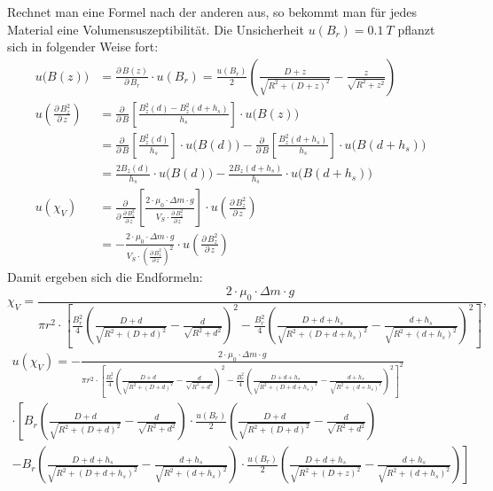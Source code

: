 \documentclass[11pt,a4paper,titlepage, ngerman]{article}
\begin{document}
	Rechnet man eine Formel nach der anderen aus, so bekommt man für jedes Material eine Volumensuszeptibilität.
	Die Unsicherheit $u(B_r) = \SI{0,1}{T}$ pflanzt sich in folgender Weise fort:
	\begin{align}
		u\big(B(z)\big) &= \frac{\partial\,B(z)}{\partial\,B_r} \cdot u(B_r) = \frac{u(B_r)}{2}\left( \frac{D+z}{\sqrt{R^2 + (D+z)^2}} - \frac{z}{\sqrt{R^2 + z^2}}\right)\\
		u\left( \frac{\partial\,B^2_z}{\partial\,z}\right)
		&= \frac{\partial\,}{\partial\,B}\left[ \frac{B_z^2(d) - B_z^2(d+h_s)}{h_s}\right]  \cdot u\big(B(z)\big)\\
		&= \frac{\partial\,}{\partial\,B} \left[ \frac{B_z^2(d)}{h_s}\right]  \cdot u\big(B(d)\big) - \frac{\partial\,}{\partial\,B} \left[ \frac{ B_z^2(d+h_s)}{h_s}\right]  \cdot u\big(B(d+h_s)\big)\\
		&= \frac{2B_z(d)}{h_s} \cdot u\big(B(d)\big) - \frac{2B_z(d+h_s)}{h_s} \cdot u\big(B(d+h_s)\big)\\
		u\left( \chi_V\right) &= \frac{\partial\,}{\partial\,\frac{\partial\,B_z^2}{\partial\,z}} \left[ \frac{2 \cdot \mu_0 \cdot \Delta m \cdot g}{V_S \cdot \frac{\partial\,B_z^2}{\partial\,z}}\right] \cdot u\left( \frac{\partial\,B_z^2}{\partial\,z}\right) \\
		&= - \frac{2 \cdot \mu_0 \cdot \Delta m \cdot g}{V_S \cdot \left( \frac{\partial\,B_z^2}{\partial\,z}\right) ^2} \cdot u\left( \frac{\partial\,B_z^2}{\partial\,z}\right)
	\end{align}
	Damit ergeben sich die Endformeln:
	\begin{equation}
		\chi_V = \frac{2 \cdot \mu_0 \cdot \Delta m \cdot g}{\pi r^2 \cdot \left[ \frac{B_r^2}{4}\left( \frac{D+d}{\sqrt{R^2 + (D+d)^2}} - \frac{d}{\sqrt{R^2 + d^2}}\right)^2 - \frac{B_r^2}{4}\left( \frac{D+d+h_s}{\sqrt{R^2 + (D+d+h_s)^2}} - \frac{d+h_s}{\sqrt{R^2 + (d+h_s)^2}}\right)^2\right] },
	\end{equation}
	\begin{align}
		u(\chi_V) = - \frac{2 \cdot \mu_0 \cdot \Delta m \cdot g}{\pi r^2 \cdot \left[ \frac{B_r^2}{4}\left( \frac{D+d}{\sqrt{R^2 + (D+d)^2}} - \frac{d}{\sqrt{R^2 + d^2}}\right)^2 - \frac{B_r^2}{4}\left( \frac{D+d+h_s}{\sqrt{R^2 + (D+d+h_s)^2}} - \frac{d+h_s}{\sqrt{R^2 + (d+h_s)^2}}\right)^2\right] ^2}\\
		\cdot \left[ B_r \left( \frac{D+d}{\sqrt{R^2 + (D+d)^2}} - \frac{d}{\sqrt{R^2 + d^2}}\right) \cdot \frac{u(B_r)}{2}\left( \frac{D+d}{\sqrt{R^2 + (D+d)^2}} - \frac{d}{\sqrt{R^2 + d^2}}\right)\right.\\
		- \left. B_r\left( \frac{D+d+h_s}{\sqrt{R^2 + (D+d+h_s)^2}} - \frac{d+h_s}{\sqrt{R^2 + (d+h_s)^2}}\right) \cdot \frac{u(B_r)}{2}\left( \frac{D+d+h_s}{\sqrt{R^2 + (D+z)^2}} - \frac{d+h_s}{\sqrt{R^2 + (d+h_s)^2}}\right)\right] 
	\end{align}
\end{document}
